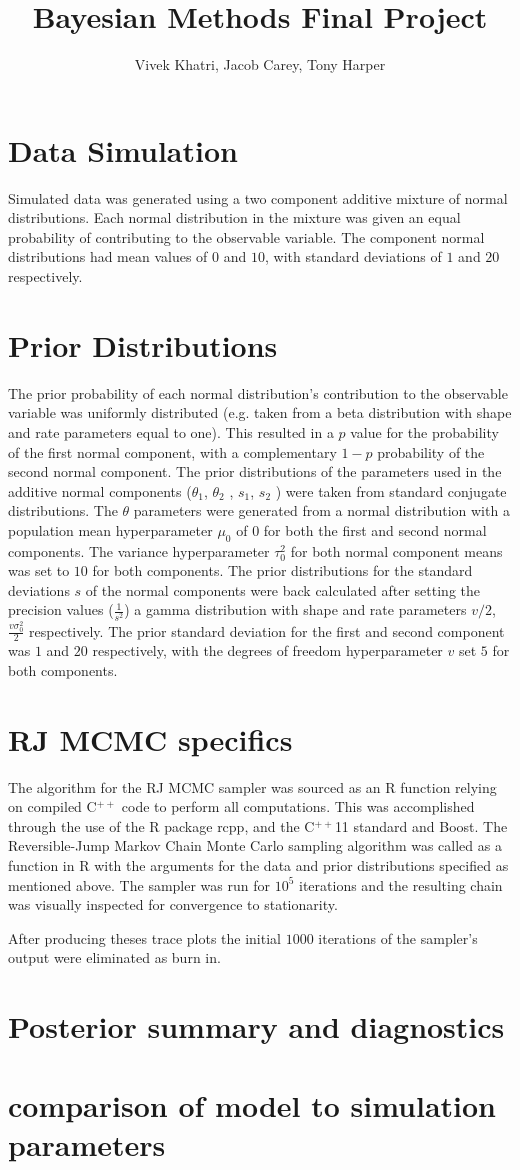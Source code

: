 \documentclass[12pt]{article}
\title{Bayesian Methods Final Project}
\author{Vivek Khatri, Jacob Carey, Tony Harper}
\date{}
\begin{document}
\section*{Data Simulation}
Simulated data was generated using a two component additive mixture of normal distributions.  Each normal distribution in the mixture was given an equal probability of contributing to the observable variable. The component normal distributions had mean values of $0$ and $10$, with standard deviations of $1$ and $20$ respectively.

\section*{Prior Distributions}
The prior probability of each normal distribution’s contribution to the observable variable was uniformly distributed (e.g. taken from a beta distribution with shape and rate parameters equal to one). This resulted in a $p$ value for the probability of the first normal component, with a complementary $1-p$ probability of the second normal component.
The prior distributions of the parameters used in the additive normal components ($\theta_1$, $\theta_2$ , $s_1$, $s_2$ ) were taken from standard conjugate distributions. The $\theta$ parameters were generated from a normal distribution with a population mean hyperparameter $\mu_0$ of $0$ for both the first and second normal components. The variance hyperparameter $\tau_0^2$ for both normal component means was set to $10$ for both components.
	The prior distributions for the standard deviations $s$ of the normal components were back calculated after setting the precision values ($\frac{1}{s^2}$)  a gamma distribution with shape and rate parameters $v/2$, $\frac{v\sigma_0^2}{2}$ respectively. The prior standard deviation for the first and second component  was $1$ and $20$ respectively, with the degrees of freedom hyperparameter $v$ set $5$ for both components. 

\section*{RJ MCMC specifics}
The algorithm for the RJ MCMC sampler was sourced as an R function relying on compiled C$^{++}$ code  to perform all computations. This was accomplished through the use of the R package rcpp, and the C$^{++}$11 standard and Boost. The Reversible-Jump Markov Chain Monte Carlo sampling algorithm was called as a function in R with the arguments for the data and prior distributions specified as mentioned above. The sampler was run for $10^5$ iterations and the resulting chain was visually inspected for convergence to stationarity.


After producing theses trace plots the initial $1000$ iterations of the sampler's output were eliminated as burn in.

\section*{Posterior summary and diagnostics}

\section*{comparison of model to simulation parameters}
\end{document}
